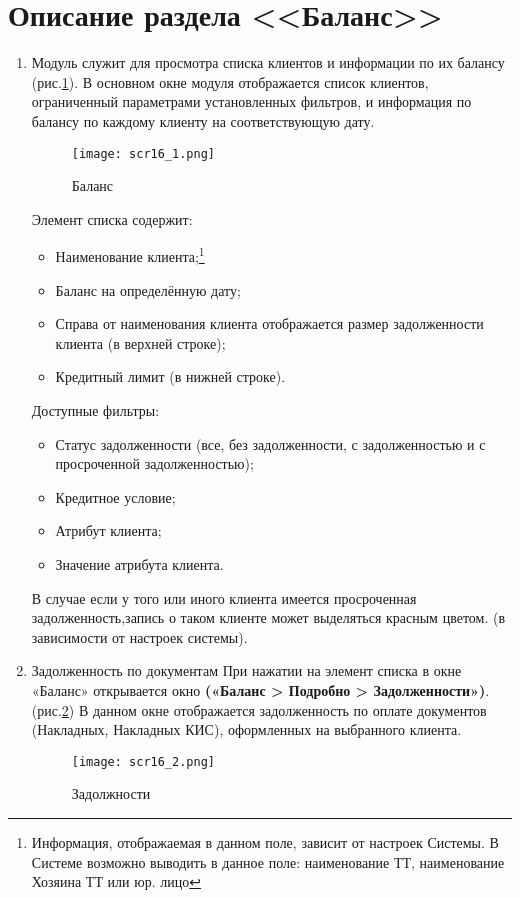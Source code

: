 \section{Описание раздела <<Баланс>>}
\begin{enumerate}[\thesection .1]
\item Модуль служит для просмотра списка клиентов и информации по их балансу (рис.\ref {pic:pic16_1}). В основном окне модуля отображается список клиентов, ограниченный параметрами установленных фильтров, и информация по балансу по каждому клиенту на соответствующую дату. 
\begin{figure}[!h]
	\texttt{[image: scr16\_1.png]} 
	\caption{Баланс}\label{pic:pic16_1}
\end{figure}
Элемент списка содержит:
\begin{itemize}
	\item Наименование клиента;\footnote{Информация, отображаемая в данном поле, зависит от настроек Системы. В Системе возможно выводить в данное поле: наименование ТТ, наименование Хозяина ТТ или юр. лицо}
	\item Баланс на определённую дату;
	\item Справа от наименования клиента отображается размер задолженности клиента (в верхней строке);
	\item Кредитный лимит (в нижней строке).
\end{itemize}
Доступные фильтры:
\begin{itemize}
	\item Статус задолженности (все, без задолженности, с задолженностью и с просроченной задолженностью);
	\item Кредитное условие;
	\item Атрибут клиента;
	\item Значение атрибута клиента.
\end{itemize}
В случае если у того или иного клиента имеется просроченная задолженность,запись о таком клиенте может выделяться красным цветом. (в зависимости от настроек системы). 
%
\item Задолженность по документам
При нажатии на элемент списка в окне «Баланс» открывается окно  \textbf{(«Баланс > Подробно > Задолженности»)}. (рис.\ref {pic:pic16_2}) В данном окне отображается задолженность по оплате документов (Накладных, Накладных КИС), оформленных на выбранного клиента. 
\begin{figure}[!h]
	\texttt{[image: scr16\_2.png]} 
	\caption{Задолжности}\label{pic:pic16_2}

\end{figure}
\end{enumerate}
